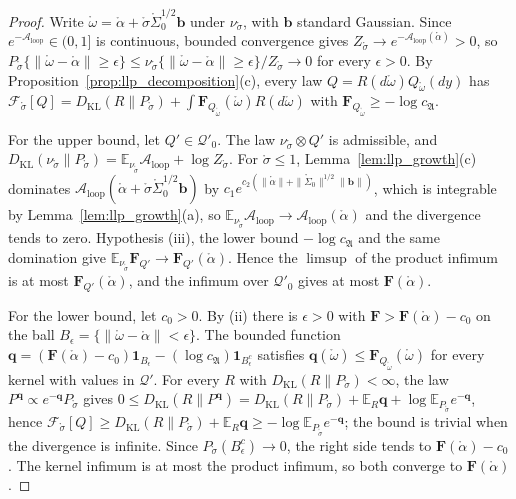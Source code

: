 \begin{proof}
Write $\mathring\omega=\mathring\alpha+\mathring\sigma\mathring\Sigma_0^{1/2}\mathbf b$ under $\nu_{\mathring\sigma}$, with $\mathbf b$ standard Gaussian. Since $e^{-\mathcal A_{\mathrm{loop}}}\in(0,1]$ is continuous, bounded convergence gives $Z_{\mathring\sigma}\to e^{-\mathcal A_{\mathrm{loop}}(\mathring\alpha)}>0$, so $P_{\mathring\sigma}\{\|\mathring\omega-\mathring\alpha\|\geq\epsilon\}\leq\nu_{\mathring\sigma}\{\|\mathring\omega-\mathring\alpha\|\geq\epsilon\}/Z_{\mathring\sigma}\to0$ for every $\epsilon>0$. By Proposition~\ref{prop:llp_decomposition}(c), every law $Q=R(d\mathring\omega)Q_{\mathring\omega}(dy)$ has $\mathcal F_{\mathring\sigma}[Q]=D_{\mathrm{KL}}(R\|P_{\mathring\sigma})+\int\mathbf F_{Q_{\mathring\omega}}(\mathring\omega)R(d\mathring\omega)$ with $\mathbf F_{Q_{\mathring\omega}}\geq-\log c_{\mathfrak A}$.

For the upper bound, let $Q'\in\mathcal Q'_0$. The law $\nu_{\mathring\sigma}\otimes Q'$ is admissible, and $D_{\mathrm{KL}}(\nu_{\mathring\sigma}\|P_{\mathring\sigma})=\mathbb E_{\nu_{\mathring\sigma}}\mathcal A_{\mathrm{loop}}+\log Z_{\mathring\sigma}$. For $\mathring\sigma\leq1$, Lemma~\ref{lem:llp_growth}(c) dominates $\mathcal A_{\mathrm{loop}}(\mathring\alpha+\mathring\sigma\mathring\Sigma_0^{1/2}\mathbf b)$ by $c_1e^{c_2(\|\mathring\alpha\|+\|\mathring\Sigma_0\|^{1/2}\|\mathbf b\|)}$, which is integrable by Lemma~\ref{lem:llp_growth}(a), so $\mathbb E_{\nu_{\mathring\sigma}}\mathcal A_{\mathrm{loop}}\to\mathcal A_{\mathrm{loop}}(\mathring\alpha)$ and the divergence tends to zero. Hypothesis (iii), the lower bound $-\log c_{\mathfrak A}$ and the same domination give $\mathbb E_{\nu_{\mathring\sigma}}\mathbf F_{Q'}\to\mathbf F_{Q'}(\mathring\alpha)$. Hence the $\limsup$ of the product infimum is at most $\mathbf F_{Q'}(\mathring\alpha)$, and the infimum over $\mathcal Q'_0$ gives at most $\mathbf F(\mathring\alpha)$.

For the lower bound, let $c_0>0$. By (ii) there is $\epsilon>0$ with $\mathbf F>\mathbf F(\mathring\alpha)-c_0$ on the ball $B_\epsilon=\{\|\mathring\omega-\mathring\alpha\|<\epsilon\}$. The bounded function $\mathbf q=(\mathbf F(\mathring\alpha)-c_0)\mathbf 1_{B_\epsilon}-(\log c_{\mathfrak A})\mathbf 1_{B_\epsilon^c}$ satisfies $\mathbf q(\mathring\omega)\leq\mathbf F_{Q_{\mathring\omega}}(\mathring\omega)$ for every kernel with values in $\mathcal Q'$. For every $R$ with $D_{\mathrm{KL}}(R\|P_{\mathring\sigma})<\infty$, the law $P^{\mathbf q}\propto e^{-\mathbf q}P_{\mathring\sigma}$ gives $0\leq D_{\mathrm{KL}}(R\|P^{\mathbf q})=D_{\mathrm{KL}}(R\|P_{\mathring\sigma})+\mathbb E_R\mathbf q+\log\mathbb E_{P_{\mathring\sigma}}e^{-\mathbf q}$, hence $\mathcal F_{\mathring\sigma}[Q]\geq D_{\mathrm{KL}}(R\|P_{\mathring\sigma})+\mathbb E_R\mathbf q\geq-\log\mathbb E_{P_{\mathring\sigma}}e^{-\mathbf q}$; the bound is trivial when the divergence is infinite. Since $P_{\mathring\sigma}(B_\epsilon^c)\to0$, the right side tends to $\mathbf F(\mathring\alpha)-c_0$. The kernel infimum is at most the product infimum, so both converge to $\mathbf F(\mathring\alpha)$.
\end{proof}


